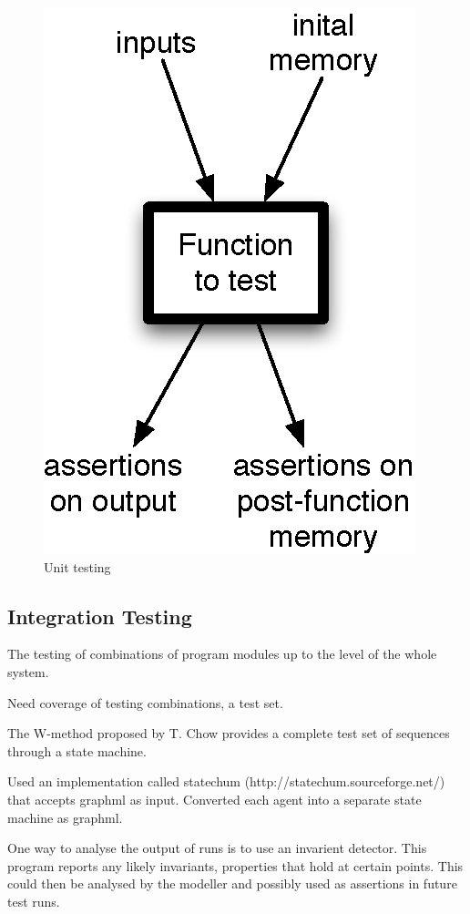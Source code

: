 \begin{figure}[hb]
\centering
\includegraphics[scale=1.0]{unittest.eps}
\caption{Unit testing}
\label{fig:unittesting}
\end{figure}

\subsection{Integration Testing}

The testing of combinations of program modules up to the level of the whole
system.

Need coverage of testing combinations, a test set.

The W-method proposed by T. Chow \cite{CHOW:1978} provides a complete test set
of sequences through a state machine.

Used an implementation called statechum (http://statechum.sourceforge.net/)
that accepts graphml as input. Converted each agent into a separate state
machine as graphml. 

One way to analyse the output of runs is to use an invarient detector. This
program reports any likely invariants, properties that hold at certain points.
This could then be analysed by the modeller and possibly used as assertions in
future test runs.

